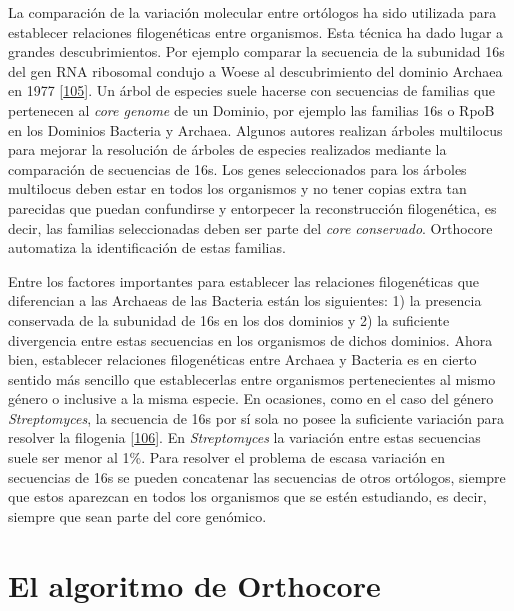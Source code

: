 \documentclass[12pt,twoside]{reedthesis}
\begin{document}
  La comparación de la variación molecular entre ortólogos ha sido
  utilizada para establecer relaciones filogenéticas entre organismos.
  Esta técnica ha dado lugar a grandes descubrimientos. Por ejemplo
  comparar la secuencia de la subunidad 16s del gen RNA ribosomal condujo
  a Woese al descubrimiento del dominio Archaea en 1977
  {[}\protect\hyperlink{ref-woese_phylogenetic_1977}{105}{]}. Un árbol de
  especies suele hacerse con secuencias de familias que pertenecen al
  \emph{core genome} de un Dominio, por ejemplo las familias 16s o RpoB en
  los Dominios Bacteria y Archaea. Algunos autores realizan árboles
  multilocus para mejorar la resolución de árboles de especies realizados
  mediante la comparación de secuencias de 16s. Los genes seleccionados
  para los árboles multilocus deben estar en todos los organismos y no
  tener copias extra tan parecidas que puedan confundirse y entorpecer la
  reconstrucción filogenética, es decir, las familias seleccionadas deben
  ser parte del \emph{core conservado}. Orthocore automatiza la
  identificación de estas familias.
  
  Entre los factores importantes para establecer las relaciones
  filogenéticas que diferencian a las Archaeas de las Bacteria están los
  siguientes: 1) la presencia conservada de la subunidad de 16s en los dos
  dominios y 2) la suficiente divergencia entre estas secuencias en los
  organismos de dichos dominios. Ahora bien, establecer relaciones
  filogenéticas entre Archaea y Bacteria es en cierto sentido más sencillo
  que establecerlas entre organismos pertenecientes al mismo género o
  inclusive a la misma especie. En ocasiones, como en el caso del género
  \emph{Streptomyces}, la secuencia de 16s por sí sola no posee la
  suficiente variación para resolver la filogenia
  {[}\protect\hyperlink{ref-labeda_phylogenetic_2017}{106}{]}. En
  \emph{Streptomyces} la variación entre estas secuencias suele ser menor
  al 1\%. Para resolver el problema de escasa variación en secuencias de
  16s se pueden concatenar las secuencias de otros ortólogos, siempre que
  estos aparezcan en todos los organismos que se estén estudiando, es
  decir, siempre que sean parte del core genómico.
  
  \section{El algoritmo de Orthocore}\label{el-algoritmo-de-orthocore}
  
\end{document}
